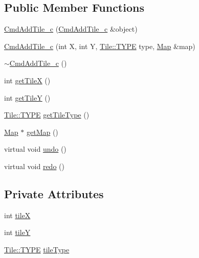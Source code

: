 \subsection*{Public Member Functions}
\begin{DoxyCompactItemize}
\item 
\hyperlink{class_cmd_add_tile__c_af7d982818c0685139d782ed0e075eef8}{Cmd\+Add\+Tile\+\_\+c} (\hyperlink{class_cmd_add_tile__c}{Cmd\+Add\+Tile\+\_\+c} \&object)
\item 
\hyperlink{class_cmd_add_tile__c_af83778c372aa4b2a00c9af907cb69da5}{Cmd\+Add\+Tile\+\_\+c} (int X, int Y, \hyperlink{class_tile_acb53d82f9dacff45a98acc63276928eb}{Tile\+::\+T\+Y\+P\+E} type, \hyperlink{class_map}{Map} \&map)
\item 
\hyperlink{class_cmd_add_tile__c_aee60b684e2feca1995b4cc009e209eaf}{$\sim$\+Cmd\+Add\+Tile\+\_\+c} ()
\item 
int \hyperlink{class_cmd_add_tile__c_ae484a29764817e2f43dc835b9a51d80c}{get\+Tile\+X} ()
\item 
int \hyperlink{class_cmd_add_tile__c_a36b0863691f44f229fc11783fe7e4756}{get\+Tile\+Y} ()
\item 
\hyperlink{class_tile_acb53d82f9dacff45a98acc63276928eb}{Tile\+::\+T\+Y\+P\+E} \hyperlink{class_cmd_add_tile__c_a433017f62b21a8dd20f4c647dba5a49a}{get\+Tile\+Type} ()
\item 
\hyperlink{class_map}{Map} $\ast$ \hyperlink{class_cmd_add_tile__c_a4f797c36fffefbedbb044575918c7871}{get\+Map} ()
\item 
virtual void \hyperlink{class_cmd_add_tile__c_ae2cf1ae80b5d05be7fea2fc57954a617}{undo} ()
\item 
virtual void \hyperlink{class_cmd_add_tile__c_aedf0b5944d1cc3a15372b74a78ac54b4}{redo} ()
\end{DoxyCompactItemize}
\subsection*{Private Attributes}
\begin{DoxyCompactItemize}
\item 
int \hyperlink{class_cmd_add_tile__c_a27acebabf8cf1f1ab573fbe21f386cd9}{tile\+X}
\item 
int \hyperlink{class_cmd_add_tile__c_a12e82cc61f89b30d78e9b03999902410}{tile\+Y}
\item 
\hyperlink{class_tile_acb53d82f9dacff45a98acc63276928eb}{Tile\+::\+T\+Y\+P\+E} \hyperlink{class_cmd_add_tile__c_a233542914c106180381f9188b6f71a1e}{tile\+Type}
\end{DoxyCompactItemize}
